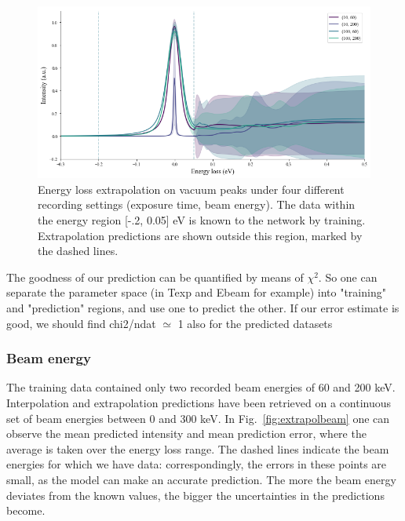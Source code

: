 \begin{figure}[H]
    \centering
    \includegraphics[width=120mm]{plots/extrapolate_energyloss.png}
    \caption{Energy loss extrapolation on vacuum peaks under four different recording settings (exposure time, beam energy). The data within the energy region [-.2, 0.05] eV is known to the network by training. Extrapolation predictions are shown outside this region, marked by the dashed lines.}
    \label{fig:extrapoleloss}
\end{figure}

The goodness of our prediction can be quantified by means of $\chi^2$. So one can separate the parameter space (in Texp and Ebeam for example) into "training" and "prediction" regions, and use one to predict the other. If our error estimate is good, we should find chi2/ndat $\simeq$ 1 also for the predicted datasets


\subsubsection{Beam energy}
\label{sec:ebeam}
The training data contained only two recorded beam energies of 60 and 200 keV. Interpolation and extrapolation predictions have been retrieved on a continuous set of beam energies between 0 and 300 keV. In Fig.~\ref{fig:extrapolbeam} one can observe the mean predicted intensity and mean prediction error, where the average is taken over the energy loss range. The dashed lines indicate the beam energies for which we have data: correspondingly, the errors in these points are small, as the model can make an accurate prediction. The more the beam energy deviates from the known values, the bigger the uncertainties in the predictions become. 

